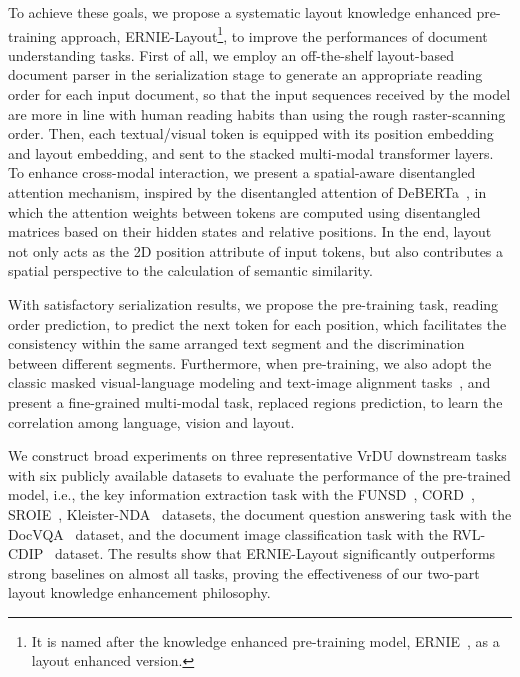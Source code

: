 \documentclass[11pt]{article}
\begin{document}
To achieve these goals, we propose a systematic layout knowledge enhanced pre-training approach, ERNIE-Layout\footnote{It is named after the knowledge enhanced pre-training model, ERNIE~\cite{sun2019ernie}, as a layout enhanced version.}, to improve the performances of document understanding tasks. 
First of all, we employ an off-the-shelf layout-based document parser in the serialization stage to generate an appropriate reading order for each input document, so that the input sequences received by the model are more in line with human reading habits than using the rough raster-scanning order.
Then, each textual/visual token is equipped with its position embedding and layout embedding, and sent to the stacked multi-modal transformer layers.
To enhance cross-modal interaction, we present a spatial-aware disentangled attention mechanism, inspired by the disentangled attention of DeBERTa~\cite{he2021deberta}, in which the attention weights between tokens are computed using disentangled matrices based on their hidden states and relative positions. 
In the end, layout not only acts as the 2D position attribute of input tokens, but also contributes a spatial perspective to the calculation of semantic similarity.

With satisfactory serialization results, we propose the pre-training task, reading order prediction, to predict the next token for each position, which facilitates the consistency within the same arranged text segment and the discrimination between different segments.
Furthermore, when pre-training, we also adopt the classic masked visual-language modeling and text-image alignment tasks~\cite{xu2021layoutlmv2}, and present a fine-grained multi-modal task, replaced regions prediction, to learn the correlation among language, vision and layout. 

We construct broad experiments on three representative VrDU downstream tasks with six publicly available datasets to evaluate the performance of the pre-trained model, i.e., the key information extraction task with the FUNSD~\cite{jain2019multimodal}, CORD~\cite{park2019cord}, SROIE~\cite{huang2019icdar2019}, Kleister-NDA~\cite{gralinski2021kleister} datasets, the document question answering task with the DocVQA~\cite{mathew2021docvqa} dataset, and the document image classification task with the RVL-CDIP~\cite{harley2015evaluation} dataset.
The results show that ERNIE-Layout significantly outperforms strong baselines on almost all tasks,  proving the effectiveness of our two-part layout knowledge enhancement philosophy.
\end{document}
